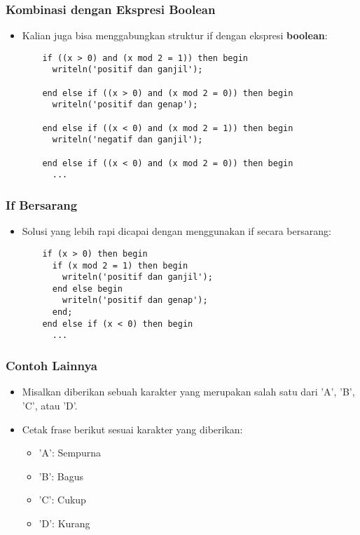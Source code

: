 \begin{frame}[fragile]
\frametitle{Kombinasi dengan Ekspresi Boolean}
\begin{itemize}
  \item Kalian juga bisa menggabungkan struktur if dengan ekspresi \textbf{boolean}:
  \begin{lstlisting}
    if ((x > 0) and (x mod 2 = 1)) then begin
      writeln('positif dan ganjil');

    end else if ((x > 0) and (x mod 2 = 0)) then begin
      writeln('positif dan genap');

    end else if ((x < 0) and (x mod 2 = 1)) then begin
      writeln('negatif dan ganjil');

    end else if ((x < 0) and (x mod 2 = 0)) then begin
      ...
  \end{lstlisting}
\end{itemize}
\end{frame}

\begin{frame}[fragile]
\frametitle{If Bersarang}
\begin{itemize}
  \item Solusi yang lebih rapi dicapai dengan menggunakan if secara bersarang:
  \begin{lstlisting}
    if (x > 0) then begin
      if (x mod 2 = 1) then begin
        writeln('positif dan ganjil');
      end else begin
        writeln('positif dan genap');
      end;
    end else if (x < 0) then begin
      ...
  \end{lstlisting}
\end{itemize}
\end{frame}

\begin{frame}
\frametitle{Contoh Lainnya}
\begin{itemize}
  \item Misalkan diberikan sebuah karakter yang merupakan salah satu dari 'A', 'B', 'C', atau 'D'.
  \item Cetak frase berikut sesuai karakter yang diberikan:
  \begin{itemize}
    \item 'A': Sempurna
    \item 'B': Bagus
    \item 'C': Cukup
    \item 'D': Kurang
  \end{itemize}
\end{itemize}
\end{frame}

